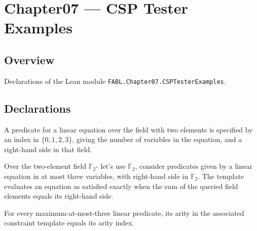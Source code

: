 \chapter{Chapter07 — CSP Tester Examples}
\section{Overview}

Declarations of the Lean module \texttt{FABL.Chapter07.CSPTesterExamples}.

\section{Declarations}

\begin{definition}
\label{FABL.MaxThreeLinPredicate}
\leanok
{}
A predicate for a linear equation over the field with two elements is specified by an
index in $\{0,1,2,3\}$, giving the number of variables in the equation, and a right-hand
side in that field.
\end{definition}

\begin{definition}
\label{FABL.maxAtMostThreeLinTemplate}
\leanok
{}
Over the two-element field $\mathbb{F}_2$- let's use $\mathbb{F}_2$, consider predicates given
by a linear equation in at most three variables, with right-hand side in $\mathbb{F}_2$.
The template evaluates an equation as satisfied exactly when the sum of the queried
field elements equals its right-hand side.
\end{definition}

\begin{theorem}
\label{FABL.maxAtMostThreeLinTemplate_arity}
\leanok
{}
For every maximum-at-most-three linear predicate, its arity in the associated constraint
template equals its arity index.
\end{theorem}

